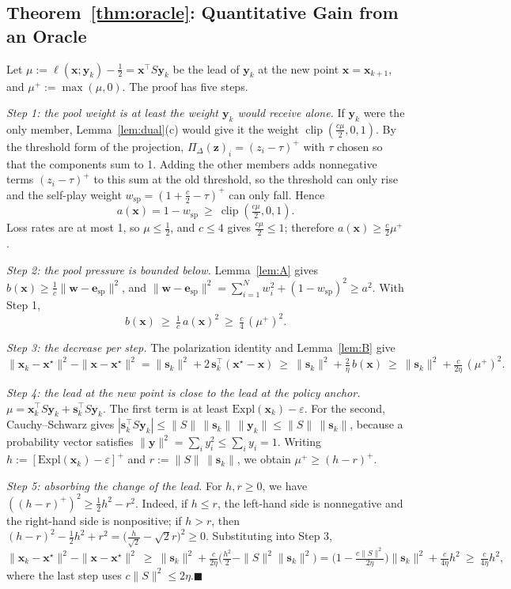\documentclass{article} %
\theoremstyle{plain}
\theoremstyle{remark}
\newcommand{\Expl}{\mathrm{Expl}}
\newcommand{\Proj}{\Pi}
\newcommand{\simplex}{\Delta}
\newcommand{\bx}{{\bm{x}}}
\newcommand{\by}{{\bm{y}}}
\newcommand{\bw}{{\bm{w}}}
\newcommand{\bz}{{\bm{z}}}
\newcommand{\be}{{\bm{e}}}
\newcommand{\xs}{\bx^{\star}}
\newcommand{\dx}{{\bm{s}}}
\newcommand{\esp}{\be_{\mathrm{sp}}}
\newcommand{\wsp}{w_{\mathrm{sp}}}
\begin{document}
\subsection{Theorem~\ref{thm:oracle}: Quantitative Gain from an Oracle}
\label{app:oracle}

Let $\mu:=\ell(\bx;\by_k)-\tfrac12=\bx^\top S\by_k$ be the lead of $\by_k$ at the new point $\bx=\bx_{k+1}$, and $\mu^+:=\max(\mu,0)$. The proof has five steps.

\textit{Step 1: the pool weight is at least the weight $\by_k$ would receive alone.} If $\by_k$ were the only member, Lemma~\ref{lem:dual}(c) would give it the weight $\operatorname{clip}(\tfrac{c\mu}2,0,1)$. By the threshold form of the projection, $\Proj_\simplex(\bz)_i=(z_i-\tau)^+$ with $\tau$ chosen so that the components sum to 1. Adding the other members adds nonnegative terms $(z_i-\tau)^+$ to this sum at the old threshold, so the threshold can only rise and the self-play weight $\wsp=(1+\tfrac c2-\tau)^+$ can only fall. Hence
\[
a(\bx)=1-\wsp\ \ge\ \operatorname{clip}(\tfrac{c\mu}2,0,1).
\]
Loss rates are at most 1, so $\mu\le\tfrac12$, and $c\le4$ gives $\tfrac{c\mu}2\le1$; therefore $a(\bx)\ge\tfrac c2\mu^+$.

\textit{Step 2: the pool pressure is bounded below.} Lemma~\ref{lem:A} gives $b(\bx)\ge\tfrac1c\|\bw-\esp\|^2$, and $\|\bw-\esp\|^2=\sum_{i=1}^Nw_i^2+(1-\wsp)^2\ge a^2$. With Step 1,
\[
b(\bx)\ \ge\ \tfrac1c\,a(\bx)^2\ \ge\ \tfrac c4\,(\mu^+)^2 .
\]

\textit{Step 3: the decrease per step.} The polarization identity and Lemma~\ref{lem:B} give
\[
\|\bx_k-\xs\|^2-\|\bx-\xs\|^2=\|\dx_k\|^2+2\,\dx_k^\top(\xs-\bx)\ \ge\ \|\dx_k\|^2+\tfrac2\eta\,b(\bx)\ \ge\ \|\dx_k\|^2+\tfrac{c}{2\eta}\,(\mu^+)^2 .
\]

\textit{Step 4: the lead at the new point is close to the lead at the policy anchor.} $\mu=\bx_k^\top S\by_k+\dx_k^\top S\by_k$. The first term is at least $\Expl(\bx_k)-\varepsilon$. For the second, Cauchy--Schwarz gives $|\dx_k^\top S\by_k|\le\|S\|\,\|\dx_k\|\,\|\by_k\|\le\|S\|\,\|\dx_k\|$, because a probability vector satisfies $\|\by\|^2=\sum_iy_i^2\le\sum_iy_i=1$. Writing $h:=[\Expl(\bx_k)-\varepsilon]^+$ and $r:=\|S\|\,\|\dx_k\|$, we obtain $\mu^+\ge(h-r)^+$.

\textit{Step 5: absorbing the change of the lead.} For $h,r\ge0$, we have $((h-r)^+)^2\ge\tfrac12h^2-r^2$. Indeed, if $h\le r$, the left-hand side is nonnegative and the right-hand side is nonpositive; if $h>r$, then $(h-r)^2-\tfrac12h^2+r^2=\big(\tfrac{h}{\sqrt2}-\sqrt2r\big)^2\ge0$. Substituting into Step 3,
\[
\|\bx_k-\xs\|^2-\|\bx-\xs\|^2\ \ge\ \|\dx_k\|^2+\tfrac{c}{2\eta}\Big(\tfrac{h^2}2-\|S\|^2\|\dx_k\|^2\Big)=\Big(1-\tfrac{c\|S\|^2}{2\eta}\Big)\|\dx_k\|^2+\tfrac{c}{4\eta}h^2\ \ge\ \tfrac{c}{4\eta}h^2 ,
\]
where the last step uses $c\|S\|^2\le2\eta$.\hfill$\blacksquare$
\end{document}
